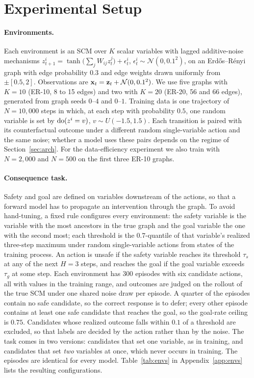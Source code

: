 \section{Experimental Setup}
\label{sec:setup}

\paragraph{Environments.}
Each environment is an SCM over $K$ scalar variables with lagged
additive-noise mechanisms $z^i_{t+1} = \tanh\big(\sum_j W_{ij} z^j_t\big) + \epsilon^i_t$,
$\epsilon^i_t \sim \mathcal{N}(0, 0.1^2)$, on an Erd\H{o}s--R\'enyi graph with
edge probability $0.3$ and edge weights drawn uniformly from $\pm[0.5, 2]$.
Observations are $\mathbf{x}_t = \mathbf{z}_t + \mathcal{N}(0, 0.1^2)$. We use five graphs
with $K = 10$ (ER-10, 8 to 15 edges) and two with $K = 20$ (ER-20, 56 and 66
edges), generated from graph seeds $0$--$4$ and $0$--$1$. Training data is one
trajectory of $N = 10{,}000$ steps in which, at each step with probability
$0.5$, one random variable is set by $\mathrm{do}(z^i = v)$, $v \sim U(-1.5, 1.5)$.
Each transition is paired with its counterfactual outcome under a different
random single-variable action and the same noise; whether a model uses these
pairs depends on the regime of Section~\ref{sec:arch}. For the data-efficiency
experiment we also train with $N = 2{,}000$ and $N = 500$ on the first three
ER-10 graphs.

\paragraph{Consequence task.}
Safety and goal are defined on variables downstream of the actions, so that a
forward model has to propagate an intervention through the graph. To avoid
hand-tuning, a fixed rule configures every environment: the safety variable is
the variable with the most ancestors in the true graph and the goal variable
the one with the second most; each threshold is the $0.7$-quantile of that
variable's realized three-step maximum under random single-variable actions
from states of the training process. An action is unsafe if the safety
variable reaches its threshold $\tau_s$ at any of the next $H = 3$ steps, and
reaches the goal if the goal variable exceeds $\tau_g$ at some step.
Each environment has 300 episodes with six candidate actions, all with values
in the training range, and outcomes are judged on the rollout of the true SCM
under one shared noise draw per episode. A quarter of the episodes contain no
safe candidate, so the correct response is to defer; every other episode
contains at least one safe candidate that reaches the goal, so the goal-rate
ceiling is $0.75$. Candidates whose realized outcome falls within $0.1$ of a
threshold are excluded, so that labels are decided by the action rather than
by the noise. The task comes in two versions: candidates that set one
variable, as in training, and candidates that set \emph{two} variables at
once, which never occurs in training. The episodes are identical for every
model. Table~\ref{tab:envs} in Appendix~\ref{app:envs} lists the resulting
configurations.

